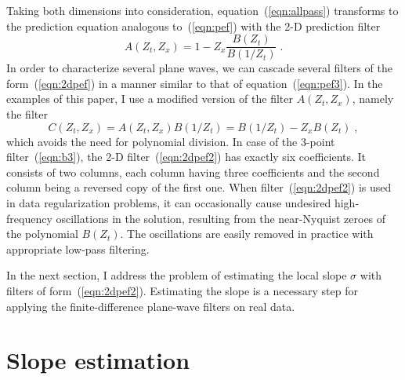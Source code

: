 \par
Taking both dimensions into consideration,
equation~(\ref{eqn:allpass}) transforms to the prediction equation
analogous to~(\ref{eqn:pef}) with the 2-D prediction filter
\begin{equation}
  A(Z_t,Z_x) = 1 - Z_x \frac{B(Z_t)}{B(1/Z_t)}\;.
  \label{eqn:2dpef}
\end{equation}
In order to characterize several plane waves, we can cascade several
filters of the form~(\ref{eqn:2dpef}) in a manner similar to that of
equation~(\ref{eqn:pef3}). In the examples of this paper, I use a
modified version of the filter $A(Z_t,Z_x)$, namely the filter
\begin{equation}
  \label{eqn:2dpef2}
  C(Z_t,Z_x) = A(Z_t,Z_x) B(1/Z_t) = B(1/Z_t) - Z_x B(Z_t)\;,
\end{equation}
which avoids the need for polynomial division. In case of the 3-point
filter~(\ref{eqn:b3}), the 2-D filter~(\ref{eqn:2dpef2}) has exactly
six coefficients. It consists of two columns, each column having three
coefficients and the second column being a reversed copy of the first
one. When filter~(\ref{eqn:2dpef2}) is used in data regularization
problems, it can occasionally cause undesired high-frequency
oscillations in the solution, resulting from the near-Nyquist zeroes
of the polynomial $B(Z_t)$. The oscillations are easily removed in
practice with appropriate low-pass filtering.
\par
In the next section, I address the problem of estimating the local
slope $\sigma$ with filters of form~(\ref{eqn:2dpef2}). Estimating
the slope is a necessary step for applying the finite-difference
plane-wave filters on real data.

\section{Slope estimation}

